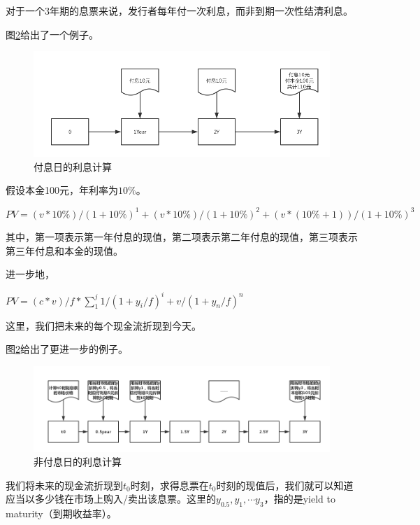 对于一个3年期的息票来说，发行者每年付一次利息，而非到期一次性结清利息。

图\ref{fig:sys.param}给出了一个例子。
\begin{figure}[htbp]
\begin{center}
\includegraphics[width=16cm]{img//Interest_Calc.PNG}
\caption{付息日的利息计算}
\label{fig:sys.param}
\end{center}
\end{figure}

假设本金100元，年利率为$10\%$。

$PV=(v*10\%)/{(1+10\%)^1} +{(v*10\%)/(1+10\%)}^2 +{(v*(10\%+1))/(1+10\%)}^3 $

其中，第一项表示第一年付息的现值，第二项表示第二年付息的现值，第三项表示第三年付息和本金的现值。

进一步地，

$PV=(c*v)/f*∑_1^j{1/{(1+y_i/f)}^i +v/{(1+y_n/f)}^n} $

这里，我们把未来的每个现金流折现到今天。

图\ref{fig:sys.param}给出了更进一步的例子。
\begin{figure}[htbp]
\begin{center}
\includegraphics[width=16cm]{img//Interest_Calc_Senior.PNG}
\caption{非付息日的利息计算}
\label{fig:sys.param}
\end{center}
\end{figure}

我们将未来的现金流折现到$t_0$时刻，求得息票在$t_0$时刻的现值后，我们就可以知道应当以多少钱在市场上购入/卖出该息票。这里的$y_0.5, y_1, \cdots y_3$，指的是yield to maturity（到期收益率）。